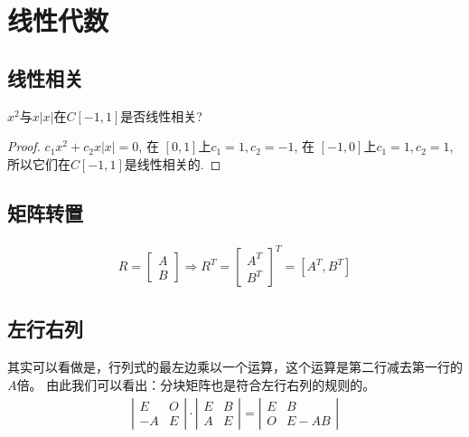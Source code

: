 \section{线性代数}
\subsection{线性相关}

$x^{2}$与$x|x|$在$C[-1,1]$是否线性相关?

\begin{proof}

    $c_{1} x^{2}+c_{2} x|x|=0 $, 
    在 $[0,1]$上$c_{1}=1,c_{2}=-1$,
    在 $[-1,0]$上$c_{1}=1,c_{2}=1$,
    所以它们在$C[-1,1]$是线性相关的. 
\end{proof}

\subsection{矩阵转置} 
\begin{align*}
    R =\begin{bmatrix}
        A\\
        B
    \end{bmatrix}
    \Longrightarrow
    R^T=\begin{bmatrix}
        A^T\\
        B^T
    \end{bmatrix}^T 
    = \left[A^T, B^T\right]
\end{align*}

\subsection{左行右列}
其实可以看做是，行列式的最左边乘以一个运算，这个运算是第二行减去第一行的$A$倍。
由此我们可以看出：分块矩阵也是符合左行右列的规则的。
\begin{align*}
    \left|
        \begin{matrix}
            E & O\\ 
            -A & E
        \end{matrix}
    \right|
    \cdot 
    \left|
        \begin{matrix}
            E & B\\ 
            A & E 
        \end{matrix}
    \right|
    = \left|
        \begin{matrix}
            E & B \\ 
            O & E - AB 
        \end{matrix}
    \right|
\end{align*}

